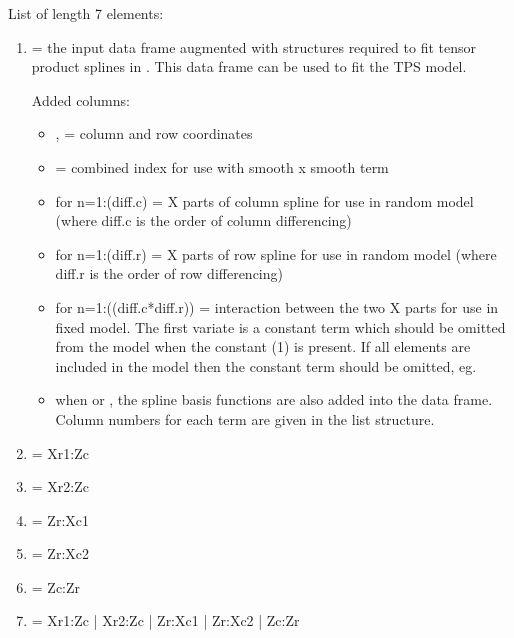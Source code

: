 \documentclass[a4paper]{book}
\begin{document}
%
\begin{Value}
List of length 7 elements:
\begin{enumerate}

\item{}  = the input data frame augmented with structures required
to fit tensor product splines in . This data frame can be used
to fit the TPS model.

Added columns:
\begin{itemize}

\item{} ,  = column and row coordinates
\item{}  = combined index for use with smooth x smooth term
\item{}  for n=1:(diff.c) = X parts of column spline for use
in random model (where diff.c is the order of column differencing)
\item{}  for n=1:(diff.r) = X parts of row spline for use in
random model (where diff.r is the order of row differencing)
\item{}  for n=1:((diff.c*diff.r)) = interaction between the
two X parts for use in fixed model. The first variate is
a constant term which should be omitted from the model when the constant
(1) is present. If all elements are
included in the model then the constant term should be omitted,
eg. 
\item{} when  or , the spline basis
functions are also added into the data frame. Column numbers for each
term are given in the  list structure.

\end{itemize}



\item{}  = Xr1:Zc
\item{}  = Xr2:Zc
\item{}  = Zr:Xc1
\item{}  = Zr:Xc2 
\item{}  = Zc:Zr
\item{}  = Xr1:Zc | Xr2:Zc | Zr:Xc1 | Zr:Xc2 | Zc:Zr


\end{enumerate}


\end{Value}
\end{document}
